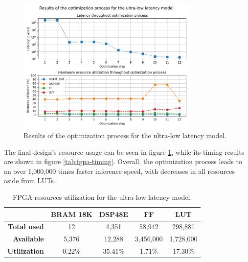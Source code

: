 \begin{figure}[hpt!]
  \centering
  \includegraphics[trim={0cm 0cm 0cm 1cm}, clip, width=0.8\textwidth, center]{../logs/hardware_optimizations.png}
  \caption{Results of the optimization process for the ultra-low latency model.}
  \label{fig:hardware-optimizations}
\end{figure}

The final design's resource usage can be seen in figure \ref{tab:utilization}, while its timing results are shown in figure \ref{tab:fgpa-timing}. Overall, the optimization process leads to an over 1,000,000 times faster inference speed, with decreases in all resources aside from LUTs.

\begin{table}[hpt!]
  \centering
  \caption{FPGA resources utilization for the ultra-low latency model.}
  \label{tab:utilization}
  \bgroup
  \def\arraystretch{1.3}
  \setlength\tabcolsep{3mm}
  \begin{tabular}{r|c|c|c|c|}
  \cline{2-5}
  \multicolumn{1}{c|}{}                      & \textbf{BRAM 18K} & \textbf{DSP48E} & \textbf{FF} & \textbf{LUT} \\ \hline
  \multicolumn{1}{|r|}{\textbf{Total used}}       & 12                 & 4,351            & 58,942       & 298,881       \\ \hline
  \multicolumn{1}{|r|}{\textbf{Available}}   & 5,376              & 12,288           & 3,456,000     & 1,728,000      \\ \hline\hline
  \multicolumn{1}{|r|}{\textbf{Utilization}} & 0.22\%            & 35.41\%         & 1.71\%      & 17.30\%       \\ \hline
  \end{tabular}
  \egroup
\end{table}

